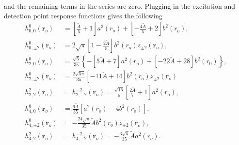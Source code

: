 \documentclass[11pt]{article}
\providecommand{\ro}[1]{\mathbf{\mathbf{r}}_o}
\begin{document}


and the remaining terms in the series are zero. Plugging in the excitation and
detection point response functions gives the following
\begin{align}
  h_{0,0}^0(\ro{}) &= \left[\frac{\tilde{A}}{5} + 1\right]a^2(r_o) + \left[-\frac{4\tilde{A}}{5} + 2\right]b^2(r_o),\\ 
  h_{0,\pm 2}^0(\ro{}) &= 2\sqrt{\pi}\left[1 - \frac{2\tilde{A}}{5}\right]b^2(r_o)z_{\pm 2}(\ro{}),\\ 
  h_{2,0}^0(\ro{}) &= \frac{\sqrt{5}}{35}\left\{-\left[5\tilde{A} + 7\right]a^2(r_o) + \left[-22\tilde{A} + 28\right]b^2(r_0)\right\},\\ 
  h_{2,\pm 2}^0(\ro{}) &= \frac{2\sqrt{5\pi}}{35}\left[-11\tilde{A} + 14\right]b^2(r_o)z_{\pm 2}(\ro{})\\ 
  h_{2,2}^{2}(\ro{}) &= h_{2,-2}^{-2}(\ro{}) = \frac{\sqrt{15}}{5}\left[\frac{2\tilde{A}}{7} + 1\right]a^2(r_o),\\ 
  h_{4,0}^0(\ro{}) &= \frac{6\tilde{A}}{35}\left[a^2(r_o) - 4b^2(r_o)\right],\\ 
  h_{4,\pm 2}^0(\ro{}) &= -\frac{24\sqrt{\pi}}{35}\tilde{A}b^2(r_o)z_{\pm 2}(\ro{}),\\ 
  h_{4,2}^{2}(\ro{}) &= h_{4,-2}^{-2}(\ro{}) = -\frac{3\sqrt{5}}{35}\tilde{A}a^2(r_o). 
\end{align}


\end{document}
